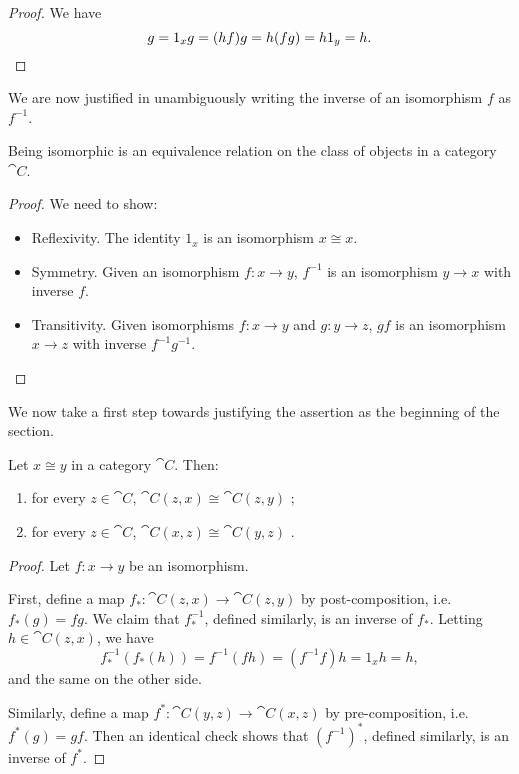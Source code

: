 \begin{proof}
  We have \[
    g = 1_xg = (hf)g = h(fg) = h1_y = h.\qedhere
  \]
\end{proof}

\begin{ntn}
  We are now justified in unambiguously writing the inverse of an isomorphism
  $f$ as $f^{-1}$.
\end{ntn}

\begin{prop}
  Being isomorphic is an equivalence relation on the class of objects in a category $\cat{C}$.
\end{prop}

\begin{proof}
  We need to show:
  \begin{itemize}
    \item Reflexivity. The identity $1_x$ is an isomorphism $x\cong x$.
    \item Symmetry. Given an isomorphism $f: x\to y$, $f^{-1}$ is an isomorphism
      $y\to x$ with inverse $f$.
    \item Transitivity. Given isomorphisms $f: x\to y$ and $g: y\to z$,
      $gf$ is an isomorphism $x\to z$ with inverse $f^{-1}g^{-1}$. \qedhere
  \end{itemize}
\end{proof}

We now take a first step towards justifying the assertion as the beginning of
the section.

\begin{prop}\label{thm:iso-implies-hom-iso}
  Let $x\cong y$ in a category $\cat{C}$. Then:
  \begin{enumerate}
    \item for every $z\in\cat{C}$, $\cat{C}(z, x)\cong\cat{C}(z, y)$
      \label{item:iso-equiv-post};
    \item for every $z\in\cat{C}$, $\cat{C}(x, z)\cong\cat{C}(y, z)$
      \label{item:iso-equiv-pre}.
  \end{enumerate}
\end{prop}

\begin{proof}
  Let $f: x\to y$ be an isomorphism.

  First, define a map $f_*: \cat{C}(z, x)\to\cat{C}(z, y)$ by post-composition,
  i.e. $f_*(g) = fg$. We claim that $f^{-1}_*$, defined similarly, is an inverse
  of $f_*$. Letting $h\in\cat{C}(z, x)$, we have \[ f^{-1}_*(f_*(h)) =
  f^{-1}(fh) = (f^{-1}f)h = 1_xh = h, \]and the same on the other side.

  Similarly, define a map $f^*: \cat{C}(y, z)\to\cat{C}(x, z)$ by
  pre-composition, i.e. $f^*(g) = gf$. Then an identical check shows that
  $(f^{-1})^*$, defined similarly, is an inverse of $f^*$.
\end{proof}

